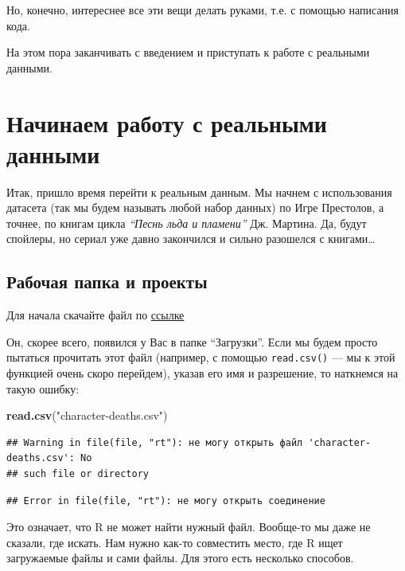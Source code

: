 \documentclass[]{book}
\newenvironment{Shaded}{\begin{snugshade}}{\end{snugshade}}
\newcommand{\KeywordTok}[1]{\textcolor[rgb]{0.13,0.29,0.53}{\textbf{#1}}}
\newcommand{\StringTok}[1]{\textcolor[rgb]{0.31,0.60,0.02}{#1}}
\newcommand{\NormalTok}[1]{#1}
\begin{document}
Но, конечно, интереснее все эти вещи делать руками, т.е. с помощью
написания кода.

На этом пора заканчивать с введением и приступать к работе с реальными
данными.

\section{Начинаем работу с реальными данными}\label{real_data}

Итак, пришло время перейти к реальным данным. Мы начнем с использования
датасета (так мы будем называть любой набор данных) по Игре Престолов, а
точнее, по книгам цикла \emph{``Песнь льда и пламени''} Дж. Мартина. Да,
будут спойлеры, но сериал уже давно закончился и сильно разошелся с
книгами\ldots{}

\subsection{Рабочая папка и проекты}\label{wd}

Для начала скачайте файл по
\href{https://raw.githubusercontent.com/Pozdniakov/stats/master/data/character-deaths.csv}{ссылке}

Он, скорее всего, появился у Вас в папке ``Загрузки''. Если мы будем
просто пытаться прочитать этот файл (например, с помощью
\texttt{read.csv()} --- мы к этой функцией очень скоро перейдем), указав
его имя и разрешение, то наткнемся на такую ошибку:

\begin{Shaded}
\begin{Highlighting}[]
\KeywordTok{read.csv}\NormalTok{(}\StringTok{"character-deaths.csv"}\NormalTok{)}
\end{Highlighting}
\end{Shaded}

\begin{verbatim}
## Warning in file(file, "rt"): не могу открыть файл 'character-deaths.csv': No
## such file or directory
\end{verbatim}

\begin{verbatim}
## Error in file(file, "rt"): не могу открыть соединение
\end{verbatim}

Это означает, что R не может найти нужный файл. Вообще-то мы даже не
сказали, где искать. Нам нужно как-то совместить место, где R ищет
загружаемые файлы и сами файлы. Для этого есть несколько способов.
\end{document}

